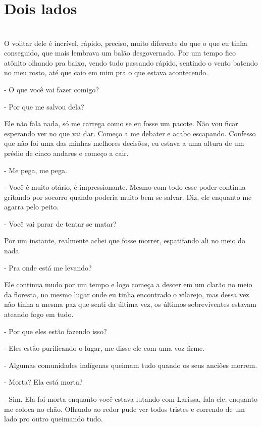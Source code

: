 
\newpage


\ifdefined\useChapters
\chapter{Dois lados}

\else
\chapter{}
\fi

O volitar dele é incrível, rápido, preciso, muito diferente do que o que eu tinha conseguido, que mais lembrava um balão desgovernado. Por um tempo fico atônito olhando pra baixo, vendo tudo passando rápido, sentindo o vento batendo no meu rosto, até que caio em mim pra o que estava acontecendo.

- O que você vai fazer comigo?

-  Por que me salvou dela?

Ele não fala nada, só me carrega como se eu fosse um pacote. Não vou ficar esperando ver no que vai dar. Começo a me debater e acabo escapando. Confesso que não foi uma das minhas melhores decisões, eu estava a uma altura de um prédio de cinco andares e começo a cair.

- Me pega, me pega.

- Você é muito otário, é impressionante. Mesmo com todo esse poder continua gritando por socorro quando poderia muito bem se salvar. Diz, ele enquanto me agarra pelo peito.

- Você vai parar de tentar se matar?

Por um instante, realmente achei que fosse morrer, espatifando ali no meio do nada.

- Pra onde está me levando?

Ele continua mudo por um tempo e logo começa a descer em um clarão no meio da floresta, no mesmo lugar onde eu tinha encontrado o vilarejo, mas dessa vez não tinha a mesma paz que senti da última vez, os últimos sobreviventes estavam ateando fogo em tudo.

- Por que eles estão fazendo isso?

- Eles estão purificando o lugar, me disse ele com uma voz firme.

- Algumas comunidades indígenas queimam tudo quando os seus anciões morrem.

- Morta? Ela está morta?

- Sim. Ela foi morta enquanto você estava lutando com Larissa, fala ele, enquanto me coloca no chão. Olhando ao redor pude ver todos tristes e correndo de um lado pro outro queimando tudo.

